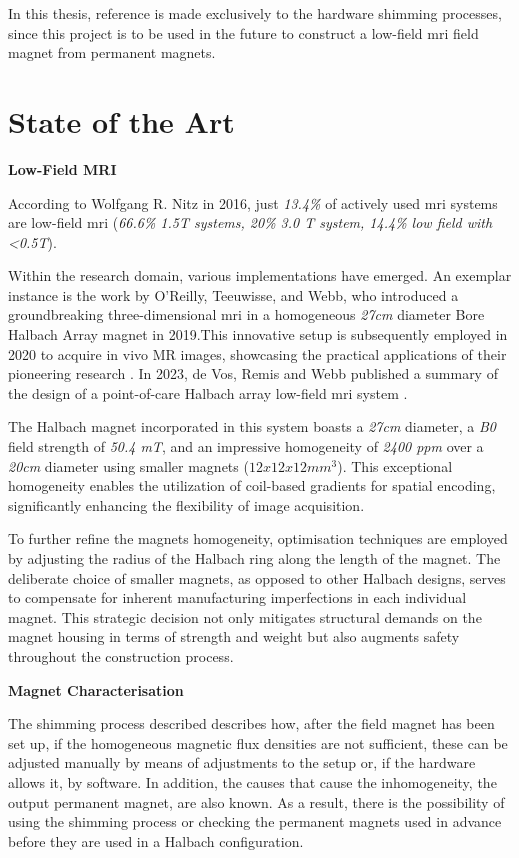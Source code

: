 In this thesis, reference is made exclusively to the hardware shimming
processes, since this project is to be used in the future to construct a
low-field \gls{mri} field magnet from permanent magnets.

\hypertarget{state-of-the-art}{%
\section{State of the Art}\label{state-of-the-art}}

\textbf{Low-Field MRI}

According to Wolfgang R. Nitz in 2016, just \emph{13.4\%} of actively
used \gls{mri} systems are low-field \gls{mri} (\emph{66.6\% 1.5T
systems, 20\% 3.0 T system, 14.4\% low field with \textless0.5T}).

Within the research domain, various implementations have emerged. An
exemplar instance is the work by O'Reilly, Teeuwisse, and Webb, who
introduced a groundbreaking three-dimensional \gls{mri} in a homogeneous
\emph{27cm} diameter Bore Halbach Array magnet  in
2019.This innovative setup is subsequently employed in 2020 to acquire
in vivo MR images, showcasing the practical applications of their
pioneering research . In 2023, de Vos, Remis and Webb
published a summary of the design of a point-of-care Halbach array
low-field \gls{mri} system .

The Halbach magnet incorporated in this system boasts a \emph{27cm}
diameter, a \emph{B0} field strength of \emph{50.4 mT}, and an
impressive homogeneity of \emph{2400 \gls{ppm}} over a \emph{20cm}
diameter using smaller magnets (\(12 x 12 x 12 mm^3\)). This exceptional
homogeneity enables the utilization of coil-based gradients for spatial
encoding, significantly enhancing the flexibility of image acquisition.

To further refine the magnets homogeneity, optimisation techniques are
employed by adjusting the radius of the Halbach ring along the length of
the magnet. The deliberate choice of smaller magnets, as opposed to
other Halbach designs, serves to compensate for inherent manufacturing
imperfections in each individual magnet. This strategic decision not
only mitigates structural demands on the magnet housing in terms of
strength and weight but also augments safety throughout the construction
process.

\textbf{Magnet Characterisation}

The shimming process described describes how, after the field magnet has
been set up, if the homogeneous magnetic flux densities are not
sufficient, these can be adjusted manually by means of adjustments to
the setup or, if the hardware allows it, by software. In addition, the
causes that cause the inhomogeneity, the output permanent magnet, are
also known. As a result, there is the possibility of using the shimming
process or checking the permanent magnets used in advance before they
are used in a Halbach configuration.

